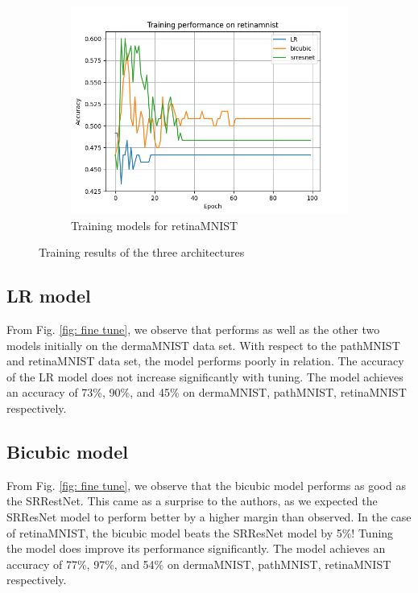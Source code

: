 \documentclass[10pt,twocolumn,letterpaper]{article}
\begin{document}
\begin{figure}
    \begin{subfigure}{0.3\textwidth}
        \includegraphics[width=\linewidth]{Code/plots/train_retinamnist.png}         \caption{Training models for retinaMNIST}
        \label{fig:training retina}
    \end{subfigure}
    \caption{Training results of the three architectures}
    \label{fig:training tune}
\end{figure}

\subsection{LR model}
From Fig. \ref{fig: fine tune}, we observe that performs as well as the other two models initially on the dermaMNIST data set. With respect to the pathMNIST and retinaMNIST data set, the model performs poorly in relation. The accuracy of the LR model does not increase significantly with tuning. The model achieves an accuracy of 73\%, 90\%, and 45\% on dermaMNIST, pathMNIST, retinaMNIST respectively.

\subsection{Bicubic model}
From Fig. \ref{fig: fine tune}, we observe that the bicubic model performs as good as the SRRestNet. This came as a surprise to the authors, as we expected the SRResNet model to perform better by a higher margin than observed. In the case of retinaMNIST, the bicubic model beats the SRResNet model by 5\%! Tuning the model does improve its performance significantly. The model achieves an accuracy of 77\%, 97\%, and 54\% on dermaMNIST, pathMNIST, retinaMNIST respectively.
\end{document}
